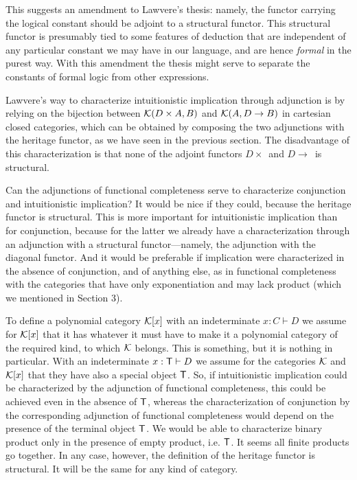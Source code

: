 This suggests an amendment to Lawvere's thesis: namely, the functor carrying
the logical constant should be adjoint to a structural functor. This
structural functor is presumably tied to some features of deduction that are
independent of any particular constant we may have in our language, and are
hence {\it formal} in the purest way. With this amendment the thesis might
serve to separate the constants of formal logic from other expressions.

Lawvere's way to characterize intuitionistic implication through adjunction
is by relying on the bijection between ${\cal K}(D\times A,B)$ and ${\cal K}%
(A,D\rightarrow B)$ in cartesian closed categories, which can be obtained by
composing the two adjunctions with the heritage functor, as we have seen in
the previous section. The disadvantage of this characterization is that none
of the adjoint functors $D\times $\ and $D\rightarrow $\ is structural.

Can the adjunctions of functional completeness serve to characterize
conjunction and intuitionistic implication? It would be nice if they could,
because the heritage functor is structural. This is more important for
intuitionistic implication than for conjunction, because for the latter we
already have a characterization through an adjunction with a structural
functor---namely, the adjunction with the diagonal functor. And it would be
preferable if implication were characterized in the absence of conjunction,
and of anything else, as in functional completeness with the categories that
have only exponentiation and may lack product (which we mentioned in Section
3).

To define a polynomial category ${\cal K}[x]$ with an indeterminate $%
x:C\vdash D$ we assume for ${\cal K}[x]$ that it has whatever it must have
to make it a polynomial category of the required kind, to which ${\cal K}$
belongs. This is something, but it is nothing in particular. With an
indeterminate $x:{\sf T}\vdash D$ we assume for the categories ${\cal K}$
and ${\cal K}[x]$ that they have also a special object ${\sf T}$. So, if
intuitionistic implication could be characterized by the adjunction of
functional completeness, this could be achieved even in the absence of ${\sf %
T}$, whereas the characterization of conjunction by the corresponding
adjunction of functional completeness would depend on the presence of the
terminal object ${\sf T}$. We would be able to characterize binary product
only in the presence of empty product, i.e. ${\sf T}$. It seems all finite
products go together. In any case, however, the definition of the heritage
functor is structural. It will be the same for any kind of category.

